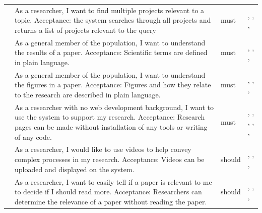 \begin{tabularx}{\linewidth}{L{1.9cm}YL{1.8cm}L{3.4cm}}
 &
As a researcher, I want to find multiple projects relevant to a topic. Acceptance: the system searches through all projects and returns a list of projects relevant to the query &
\gls{must} &
,    , ,  \\

 &
As a general member of the population, I want to understand the results of a paper. Acceptance: Scientific terms are defined in plain language. &
\gls{must} &
,    , ,  \\

 &
As a general member of the population, I want to understand the figures in a paper. Acceptance: Figures and how they relate to the research are described in plain language.&
\gls{must} &
,    , ,  \\ %

 &
As a researcher with no web development background, I want to use the system to support my research. Acceptance: Research pages can be made without installation of any tools or writing of any code. &
\gls{must} &
,    , , ,    , \\

 &
As a researcher, I would like to use videos to help convey complex processes in my research. Acceptance: Videos can be uploaded and displayed on the system.&
\gls{should} &
,    , ,  \\ 

 &
As a researcher, I want to easily tell if a paper is relevant to me to decide if I should read more. Acceptance: Researchers can determine the relevance of a paper without reading the paper. &
\gls{should} &
,    , ,  \\ %


\end{tabularx}
